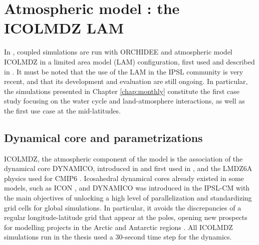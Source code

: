 
\section{Atmospheric model : the ICOLMDZ LAM}
\label{sec:ICOLMDZLAM}

In \atmchapters, coupled simulations are run with ORCHIDEE and atmospheric model ICOLMDZ in a limited area model (LAM) configuration, first used and described in \citet{raillard_leveraging_2024}. 
It must be noted that the use of the LAM in the IPSL community is very recent, and that its development and evaluation are still ongoing. In particular, the simulations presented in Chapter \ref{chap:monthly} constitute the first case study focusing on the water cycle and land-atmosphere interactions, as well as the first use case at the mid-latitudes.

\subsection{Dynamical core and parametrizations}
ICOLMDZ, the atmospheric component of the model is the association of the dynamical core DYNAMICO, introduced in \citet{dubos_dynamico-10_2015} and first used in \citet{bourdin_tropical_2024}, and the LMDZ6A physics used for CMIP6 \citep{hourdin_lmdz6a_2020}.
Icosahedral dynamical cores already existed in some models, such as ICON \citep{zangl_icon_2015,giorgetta_icon-_2018,prill_icon_2022}, and DYNAMICO was introduced in the IPSL-CM with the main objectives of unlocking a high level of parallelization and standardizing grid cells for global simulations. 
In particular, it avoids the discrepancies of a regular longitude-latitude grid that appear at the poles, opening new prospects for modelling projects in the Arctic \citep{raillard_leveraging_2024} and Antarctic regions \citep{wiener_extensive_2025}.
All ICOLMDZ simulations run in the thesis used a 30-second time step for the dynamics.

